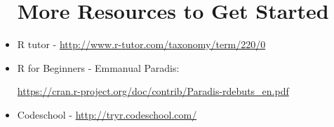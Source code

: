 \documentclass[12pt]{article}
\begin{document}
\begin{itemize}
\section{More Resources to Get Started}

\item R tutor - \href{http://www.r-tutor.com/taxonomy/term/220/0}{http://www.r-tutor.com/taxonomy/term/220/0}

\item R for Beginners - Emmanual Paradis:

\href{https://cran.r-project.org/doc/contrib/Paradis-rdebuts\_en.pdf}{https://cran.r-project.org/doc/contrib/Paradis-rdebuts\_en.pdf}

\item Codeschool - \href{http://tryr.codeschool.com/}{http://tryr.codeschool.com/}



\end{itemize}
\end{document}
